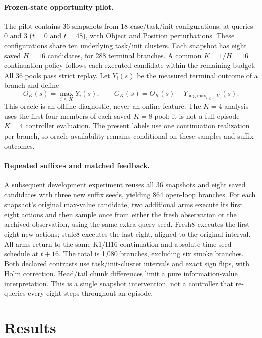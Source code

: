 \documentclass{article}
\DeclareMathOperator*{\argmax}{arg\,max}
\begin{document}
\paragraph{Frozen-state opportunity pilot.}
The pilot contains 36 snapshots from 18 case/task/init configurations, at
queries 0 and 3 ($t=0$ and $t=48$), with Object and Position perturbations.
These configurations share ten underlying task/init clusters. Each snapshot has
eight saved $H=16$ candidates, for 288 terminal branches. A common $K=1/H=16$
continuation policy follows each executed candidate within the remaining
budget. All 36 pools pass strict replay. Let $Y_i(s)$ be the measured terminal
outcome of a branch and define
\begin{equation}
 O_K(s)=\max_{i\le K}Y_i(s),\qquad
 G_K(s)=O_K(s)-Y_{\argmax_{i\le K}V_i}(s).
 \label{eq:oracle}
\end{equation}
This oracle is an offline diagnostic, never an online feature. The $K=4$
analysis uses the first four members of each saved $K=8$ pool; it is not a
full-episode $K=4$ controller evaluation. The present labels use one
continuation realization per branch, so oracle availability remains
conditional on these samples and suffix outcomes.

\paragraph{Repeated suffixes and matched feedback.}
A subsequent development experiment reuses all 36 snapshots and eight
saved candidates with three new suffix seeds, yielding 864 open-loop
branches. For each snapshot's original max-value candidate, two additional
arms execute its first eight actions and then sample once from either the
fresh observation or the archived observation, using the same extra-query
seed. Fresh8 executes the first eight new actions; stale8 executes the
last eight, aligned to the original interval. All arms return to the same
K1/H16 continuation and absolute-time seed schedule at $t+16$.
The total is 1,080 branches, excluding six smoke branches. Both declared
contrasts use task/init-cluster intervals and exact sign flips, with Holm
correction. Head/tail chunk differences limit a pure information-value
interpretation. This is a single snapshot intervention, not a controller
that re-queries every eight steps throughout an episode.

\section{Results}
\label{sec:results}
\end{document}
